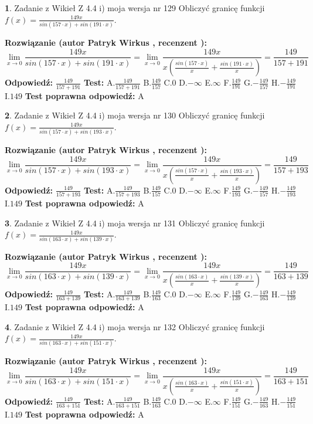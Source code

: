 \documentclass[12pt, a4paper]{article}
\theoremstyle{definition} %
\newtheorem{zad}{}
\newcommand{\zadStart}[1]{\begin{zad}#1\newline}
\newcommand{\zadStop}{\end{zad}}
\newcommand{\rozwStart}[2]{\noindent \textbf{Rozwiązanie (autor #1 , recenzent #2): }\newline}
\newcommand{\rozwStop}{\newline}
\newcommand{\odpStart}{\noindent \textbf{Odpowiedź:}\newline}
\newcommand{\odpStop}{\newline}
\newcommand{\testStart}{\noindent \textbf{Test:}\newline}
\newcommand{\testStop}{\newline}
\newcommand{\kluczStart}{\noindent \textbf{Test poprawna odpowiedź:}\newline}
\newcommand{\kluczStop}{\newline}
\begin{document}
\zadStart{Zadanie z Wikieł Z 4.4 i) moja wersja nr 129}
Obliczyć granicę funkcji $f(x)=\frac{149x}{sin(157\cdot x) +sin(191\cdot x)}$.
\zadStop
\rozwStart{Patryk Wirkus}{}
$$\lim\limits_{x\to 0}\frac{149x}{sin(157\cdot x) +sin(191\cdot x)}=\lim\limits_{x\to 0}\frac{149x}{x(\frac{sin(157\cdot x)}{x}+\frac{sin(191\cdot x)}{x})}=\frac{149}{157+191}$$
\rozwStop
\odpStart
$\frac{149}{157+191}$
\odpStop
\testStart
A.$\frac{149}{157+191}$
B.$\frac{149}{157}$
C.$0$
D.$-\infty$
E.$\infty$
F.$\frac{149}{191}$
G.$-\frac{149}{157}$
H.$-\frac{149}{191}$
I.$149$
\testStop
\kluczStart
A
\kluczStop



\zadStart{Zadanie z Wikieł Z 4.4 i) moja wersja nr 130}
Obliczyć granicę funkcji $f(x)=\frac{149x}{sin(157\cdot x) +sin(193\cdot x)}$.
\zadStop
\rozwStart{Patryk Wirkus}{}
$$\lim\limits_{x\to 0}\frac{149x}{sin(157\cdot x) +sin(193\cdot x)}=\lim\limits_{x\to 0}\frac{149x}{x(\frac{sin(157\cdot x)}{x}+\frac{sin(193\cdot x)}{x})}=\frac{149}{157+193}$$
\rozwStop
\odpStart
$\frac{149}{157+193}$
\odpStop
\testStart
A.$\frac{149}{157+193}$
B.$\frac{149}{157}$
C.$0$
D.$-\infty$
E.$\infty$
F.$\frac{149}{193}$
G.$-\frac{149}{157}$
H.$-\frac{149}{193}$
I.$149$
\testStop
\kluczStart
A
\kluczStop



\zadStart{Zadanie z Wikieł Z 4.4 i) moja wersja nr 131}
Obliczyć granicę funkcji $f(x)=\frac{149x}{sin(163\cdot x) +sin(139\cdot x)}$.
\zadStop
\rozwStart{Patryk Wirkus}{}
$$\lim\limits_{x\to 0}\frac{149x}{sin(163\cdot x) +sin(139\cdot x)}=\lim\limits_{x\to 0}\frac{149x}{x(\frac{sin(163\cdot x)}{x}+\frac{sin(139\cdot x)}{x})}=\frac{149}{163+139}$$
\rozwStop
\odpStart
$\frac{149}{163+139}$
\odpStop
\testStart
A.$\frac{149}{163+139}$
B.$\frac{149}{163}$
C.$0$
D.$-\infty$
E.$\infty$
F.$\frac{149}{139}$
G.$-\frac{149}{163}$
H.$-\frac{149}{139}$
I.$149$
\testStop
\kluczStart
A
\kluczStop



\zadStart{Zadanie z Wikieł Z 4.4 i) moja wersja nr 132}
Obliczyć granicę funkcji $f(x)=\frac{149x}{sin(163\cdot x) +sin(151\cdot x)}$.
\zadStop
\rozwStart{Patryk Wirkus}{}
$$\lim\limits_{x\to 0}\frac{149x}{sin(163\cdot x) +sin(151\cdot x)}=\lim\limits_{x\to 0}\frac{149x}{x(\frac{sin(163\cdot x)}{x}+\frac{sin(151\cdot x)}{x})}=\frac{149}{163+151}$$
\rozwStop
\odpStart
$\frac{149}{163+151}$
\odpStop
\testStart
A.$\frac{149}{163+151}$
B.$\frac{149}{163}$
C.$0$
D.$-\infty$
E.$\infty$
F.$\frac{149}{151}$
G.$-\frac{149}{163}$
H.$-\frac{149}{151}$
I.$149$
\testStop
\kluczStart
A
\kluczStop
\end{document}
